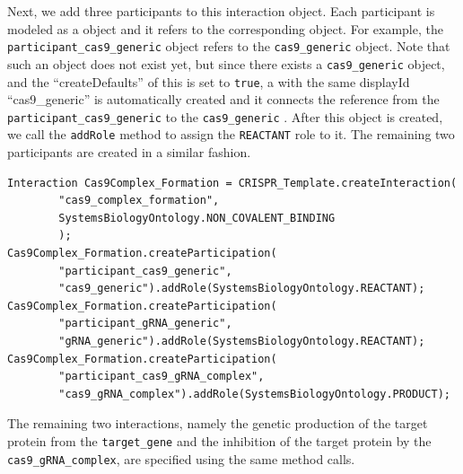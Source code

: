 Next, we add three participants to this interaction object. Each participant is modeled as a  object and it refers to the corresponding  object. For example, the \lstinline+participant_cas9_generic+  object refers to the \lstinline+cas9_generic+  object. Note that such an object does not exist yet, but since there exists a \lstinline+cas9_generic+  object, and the ``createDefaults'' of this  is set to \lstinline+true+, a  with the same displayId ``cas9\_generic'' is automatically created and it connects the reference from the \lstinline+participant_cas9_generic+  to the \lstinline+cas9_generic+ . After this  object is created, we call the \lstinline+addRole+ method to assign the \lstinline+REACTANT+ role to it. The remaining two participants are created in a similar fashion.

\vspace{\abovedisplayskip}
\begin{minipage}{0.95\textwidth}%
\begin{lstlisting}
Interaction Cas9Complex_Formation = CRISPR_Template.createInteraction(
        "cas9_complex_formation", 
        SystemsBiologyOntology.NON_COVALENT_BINDING
        );
Cas9Complex_Formation.createParticipation(
        "participant_cas9_generic", 
        "cas9_generic").addRole(SystemsBiologyOntology.REACTANT);
Cas9Complex_Formation.createParticipation(
        "participant_gRNA_generic", 
        "gRNA_generic").addRole(SystemsBiologyOntology.REACTANT);
Cas9Complex_Formation.createParticipation(
        "participant_cas9_gRNA_complex", 
        "cas9_gRNA_complex").addRole(SystemsBiologyOntology.PRODUCT);
\end{lstlisting}
\end{minipage}

The remaining two interactions, namely the genetic production of the target protein from the \lstinline+target_gene+ and the inhibition of the target protein by the \lstinline+cas9_gRNA_complex+, are specified using the same method calls.

